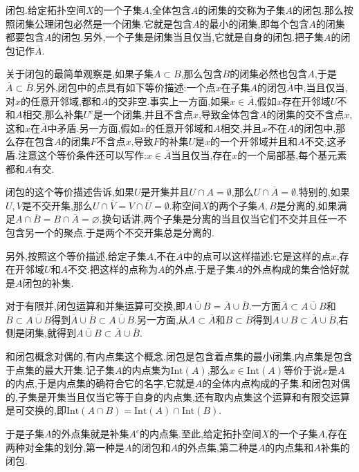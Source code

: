 闭包.给定拓扑空间$X$的一个子集$A$,全体包含$A$的闭集的交称为子集$A$的闭包.那么按照闭集公理闭包必然是一个闭集.它就是包含$A$的最小的闭集,即每个包含$A$的闭集都要包含$A$的闭包.另外,一个子集是闭集当且仅当,它就是自身的闭包.把子集$A$的闭包记作$\overline{A}$.

关于闭包的最简单观察是,如果子集$A\subset B$,那么包含$B$的闭集必然也包含$A$,于是$\overline{A}\subset\overline{B}$.另外,闭包中的点具有如下等价描述:一个点$x$在子集$A$的闭包$\overline{A}$中,当且仅当,对$x$的任意开邻域,都和$A$的交非空.事实上一方面,如果$x\in\overline{A}$,假如$x$存在开邻域$U$不和$A$相交,那么补集$U^c$是一个闭集,并且不含点$x$,导致全体包含$A$的闭集的交不含点$x$,这和$x$在$\overline{A}$中矛盾.另一方面,假如$x$的任意开邻域和$A$相交,并且$x$不在$A$的闭包中,那么存在包含$A$的闭集$F$不含点$x$,导致$F$的补集$U$是$x$的一个开邻域并且和$A$不交,这矛盾.注意这个等价条件还可以写作:$x\in\overline{A}$当且仅当,存在$x$的一个局部基,每个基元素都和$A$有交.

闭包的这个等价描述告诉,如果$U$是开集并且$U\cap A=\emptyset$,那么$U\cap\overline{A}=\emptyset$.特别的,如果$U,V$是不交开集,那么$U\cap\overline{V}=V\cap\overline{U}=\emptyset$.称空间$X$的两个子集$A,B$是分离的,如果满足$A\cap\overline{B}=B\cap\overline{A}=\varnothing$.换句话讲,两个子集是分离的当且仅当它们不交并且任一不包含另一个的聚点.于是两个不交开集总是分离的.

另外,按照这个等价描述,给定子集$A$,不在$\overline{A}$中的点可以这样描述:它是这样的点$x$,存在开邻域$U$和$A$不交.把这样的点称为$A$的外点.于是子集$A$的外点构成的集合恰好就是$A$闭包的补集.

对于有限并,闭包运算和并集运算可交换,即$\overline{A\cup B}=\overline{A}\cup\overline{B}$.一方面$\overline{A}\subset\overline{A\cup B}$和$\overline{B}\subset\overline{A\cup B}$得到$\overline{A}\cup\overline{B}\subset\overline{A\cup B}$.另一方面,从$A\subset\overline{A}$和$B\subset\overline{B}$得到$A\cup B\subset\overline{A}\cup\overline{B}$,右侧是闭集,就得到$\overline{A\cup B}\subset\overline{A}\cup\overline{B}$.

和闭包概念对偶的,有内点集这个概念.闭包是包含着点集的最小闭集,内点集是包含于点集的最大开集.记子集$A$的内点集为$\mathrm{Int}(A)$,那么$x\in\mathrm{Int}(A)$等价于说$x$是$A$的内点,于是内点集的确符合它的名字,它就是$A$的全体内点构成的子集.和闭包对偶的,子集是开集当且仅当它等于自身的内点集,还有取内点集这个运算和有限交运算是可交换的,即$\mathrm{Int}(A\cap B)=\mathrm{Int}(A)\cap\mathrm{Int}(B)$.

于是子集$A$的外点集就是补集$A^c$的内点集.至此,给定拓扑空间$X$的一个子集$A$,存在两种对全集的划分,第一种是$A$的闭包和$A$的外点集,第二种是$A$的内点集和$A$补集的闭包.

